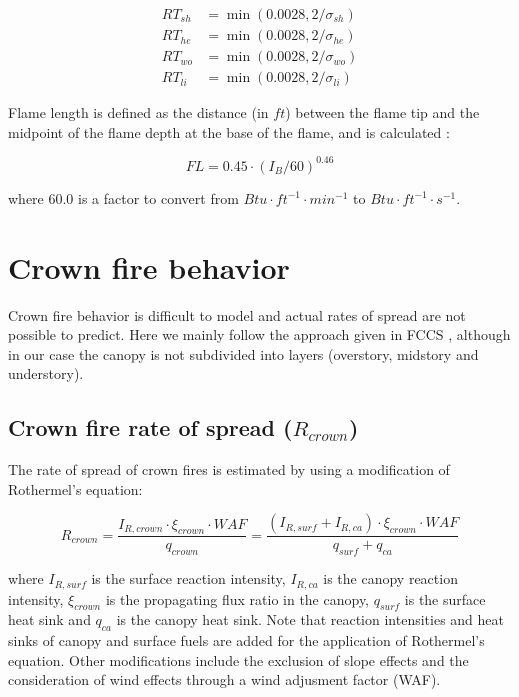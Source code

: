 \documentclass[]{book}
\begin{document}
\begin{eqnarray}
RT_{sh} &= \min(0.0028, 2/\sigma_{sh})\\
RT_{he} &= \min(0.0028, 2/\sigma_{he})\\
RT_{wo} &= \min(0.0028, 2/\sigma_{wo})\\
RT_{li} &= \min(0.0028, 2/\sigma_{li})
\end{eqnarray}

Flame length is defined as the distance (in \(ft\)) between the flame
tip and the midpoint of the flame depth at the base of the flame, and is
calculated \citep{Byram1959}:

\begin{equation}
FL = 0.45 \cdot (I_B/60)^{0.46}
\end{equation}

where 60.0 is a factor to convert from
\(Btu\cdot ft^{-1} \cdot min^{-1}\) to
\(Btu\cdot ft^{-1} \cdot s^{-1}\).

\section{Crown fire behavior}\label{crown-fire-behavior}

Crown fire behavior is difficult to model and actual rates of spread are
not possible to predict. Here we mainly follow the approach given in
FCCS \citep{Prichard2013}, although in our case the canopy is not
subdivided into layers (overstory, midstory and understory).

\subsection{Crown fire rate of spread ($R_{crown}$)}

The rate of spread of crown fires is estimated by using a modification
of Rothermel's equation:

\begin{equation}
R_{crown} = \frac{I_{R,crown} \cdot \xi_{crown}\cdot WAF}{q_{crown}} = \frac{(I_{R,surf}+I_{R,ca}) \cdot \xi_{crown}\cdot WAF}{q_{surf}+q_{ca}}
\end{equation}

where \(I_{R,surf}\) is the surface reaction intensity, \(I_{R,ca}\) is
the canopy reaction intensity, \(\xi_{crown}\) is the propagating flux
ratio in the canopy, \(q_{surf}\) is the surface heat sink and
\(q_{ca}\) is the canopy heat sink. Note that reaction intensities and
heat sinks of canopy and surface fuels are added for the application of
Rothermel's equation. Other modifications include the exclusion of slope
effects and the consideration of wind effects through a wind adjusment
factor (WAF).
\end{document}
